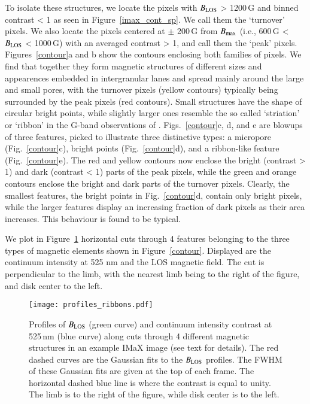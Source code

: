 \documentclass[goettingen, gauss, print]{thesis}
\begin{document}
To isolate these structures, we locate the pixels with $B_{\rm LOS}$ > 1200\,G and binned contrast < 1 as seen in Figure~\ref{imax_cont_sp}. We call them the `turnover' pixels. We also locate the pixels centered at $\pm$ 200\,G from $B_{\rm max}$ (i.e., 600\,G < $B_{\rm LOS}$ < 1000\,G) with an averaged contrast > 1, and call them the `peak' pixels. Figures~\ref{contour}a and b show the contours enclosing both families of pixels. We find that together they form magnetic structures of different sizes and appearences embedded in intergranular lanes and spread mainly around the large and small pores, with the turnover pixels (yellow contours) typically being surrounded by the peak pixels (red contours). Small structures have the shape of circular bright points, while slightly larger ones resemble the so called `striation' or `ribbon' in the G-band observations of \cite{berger_solar_2004}. Figs.~\ref{contour}c, d, and e are blowups of three features, picked to illustrate three distinctive types: a micropore (Fig.~\ref{contour}c), bright points (Fig.~\ref{contour}d), and a ribbon-like feature (Fig.~\ref{contour}e). The red and yellow contours now enclose the bright (contrast > 1) and dark (contrast < 1) parts of the peak pixels, while the green and orange contours enclose the bright and dark parts of the turnover pixels. Clearly, the smallest features, the bright points in Fig.~\ref{contour}d, contain only bright pixels, while the larger features display an increasing fraction of dark pixels as their area increases. This behaviour is found to be typical. 

We plot in Figure~\ref{profiles} horizontal cuts through 4 features belonging to the three types of magnetic elements shown in Figure~\ref{contour}. Displayed are the continuum intensity at 525 nm and the LOS magnetic field. The cut is perpendicular to the limb, with the nearest limb being to the right of the figure, and disk center to the left.

\begin{figure*}[ht!]
\centering
\hspace*{-1cm}\texttt{[image: profiles\_ribbons.pdf]}
\caption{Profiles of $B_{\rm LOS}$ (green curve) and continuum intensity contrast at 525\,nm (blue curve) along cuts through 4 different magnetic structures in an example IMaX image (see text for details). The red dashed curves are the Gaussian fits to the $B_{\rm LOS}$ profiles. The FWHM of these Gaussian fits are given at the top of each frame. The horizontal dashed blue line is where the contrast is equal to unity. The limb is to the right of the figure, while disk center is to the left.}
\label{profiles}
\end{figure*}
\end{document}
